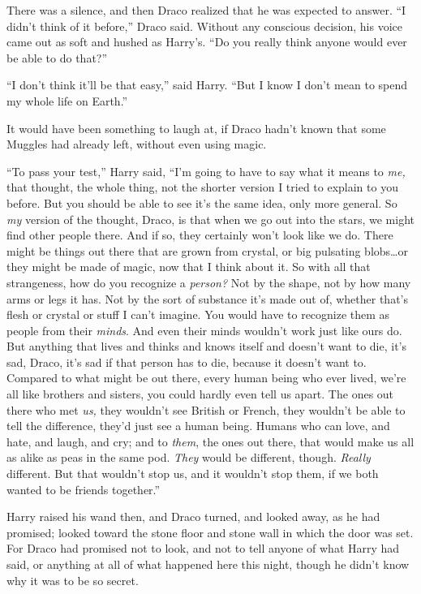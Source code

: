There was a silence, and then Draco realized that he was expected to answer. “I didn’t think of it before,” Draco said. Without any conscious decision, his voice came out as soft and hushed as Harry’s. “Do you really think anyone would ever be able to do that?”

“I don’t think it’ll be that easy,” said Harry. “But I know I don’t mean to spend my whole life on Earth.”

It would have been something to laugh at, if Draco hadn’t known that some Muggles had already left, without even using magic.

“To pass your test,” Harry said, “I’m going to have to say what it means to \emph{me,} that thought, the whole thing, not the shorter version I tried to explain to you before. But you should be able to see it’s the same idea, only more general. So \emph{my} version of the thought, Draco, is that when we go out into the stars, we might find other people there. And if so, they certainly won’t look like we do. There might be things out there that are grown from crystal, or big pulsating blobs…or they might be made of magic, now that I think about it. So with all that strangeness, how do you recognize a \emph{person?} Not by the shape, not by how many arms or legs it has. Not by the sort of substance it’s made out of, whether that’s flesh or crystal or stuff I can’t imagine. You would have to recognize them as people from their \emph{minds}. And even their minds wouldn’t work just like ours do. But anything that lives and thinks and knows itself and doesn’t want to die, it’s sad, Draco, it’s sad if that person has to die, because it doesn’t want to. Compared to what might be out there, every human being who ever lived, we’re all like brothers and sisters, you could hardly even tell us apart. The ones out there who met \emph{us,} they wouldn’t see British or French, they wouldn’t be able to tell the difference, they’d just see a human being. Humans who can love, and hate, and laugh, and cry; and to \emph{them}, the ones out there, that would make us all as alike as peas in the same pod. \emph{They} would be different, though. \emph{Really} different. But that wouldn’t stop us, and it wouldn’t stop them, if we both wanted to be friends together.”

Harry raised his wand then, and Draco turned, and looked away, as he had promised; looked toward the stone floor and stone wall in which the door was set. For Draco had promised not to look, and not to tell anyone of what Harry had said, or anything at all of what happened here this night, though he didn’t know why it was to be so secret.

